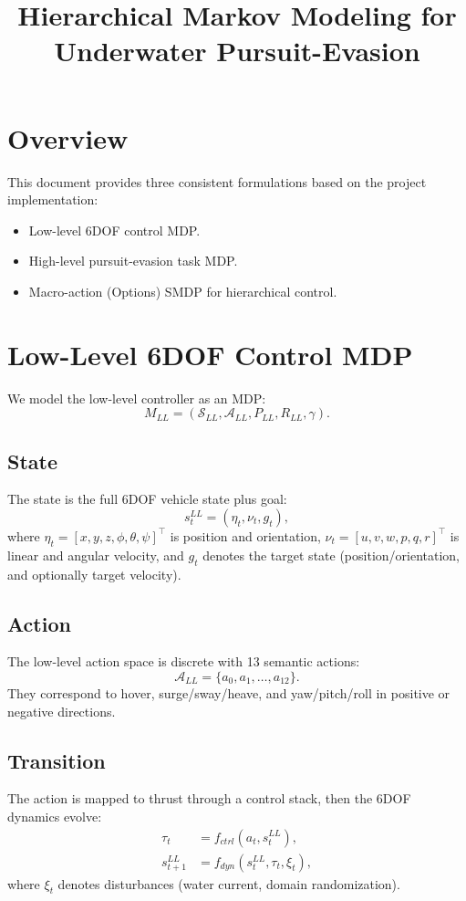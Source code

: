 \documentclass[11pt]{article}
\title{Hierarchical Markov Modeling for Underwater Pursuit-Evasion}
\author{}
\date{}
\begin{document}
\maketitle

\section{Overview}
This document provides three consistent formulations based on the project implementation:
\begin{itemize}
  \item Low-level 6DOF control MDP.
  \item High-level pursuit-evasion task MDP.
  \item Macro-action (Options) SMDP for hierarchical control.
\end{itemize}

\section{Low-Level 6DOF Control MDP}
We model the low-level controller as an MDP:
\begin{equation}
M_{LL} = (\mathcal{S}_{LL}, \mathcal{A}_{LL}, P_{LL}, R_{LL}, \gamma).
\end{equation}

\subsection*{State}
The state is the full 6DOF vehicle state plus goal:
\begin{equation}
 s_t^{LL} = (\eta_t, \nu_t, g_t),
\end{equation}
where $\eta_t = [x, y, z, \phi, \theta, \psi]^\top$ is position and orientation, $\nu_t = [u, v, w, p, q, r]^\top$ is linear and angular velocity, and $g_t$ denotes the target state (position/orientation, and optionally target velocity).

\subsection*{Action}
The low-level action space is discrete with 13 semantic actions:
\begin{equation}
\mathcal{A}_{LL} = \{a_0, a_1, \ldots, a_{12}\}.
\end{equation}
They correspond to hover, surge/sway/heave, and yaw/pitch/roll in positive or negative directions.

\subsection*{Transition}
The action is mapped to thrust through a control stack, then the 6DOF dynamics evolve:
\begin{align}
\tau_t &= f_{ctrl}(a_t, s_t^{LL}), \\
 s_{t+1}^{LL} &= f_{dyn}(s_t^{LL}, \tau_t, \xi_t),
\end{align}
where $\xi_t$ denotes disturbances (water current, domain randomization).
\end{document}
